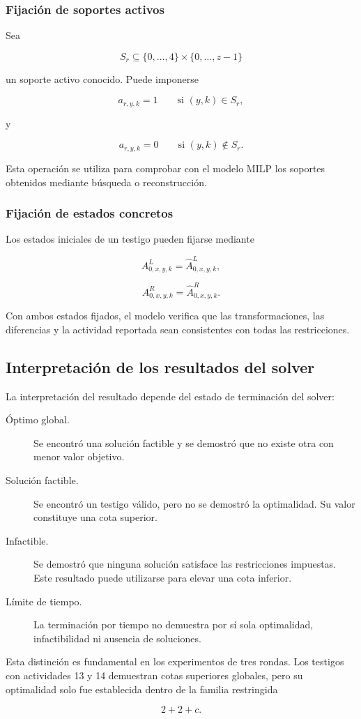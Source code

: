\subsubsection{Fijación de soportes activos}

Sea

\[
S_r
\subseteq
\{0,\ldots,4\}
\times
\{0,\ldots,z-1\}
\]

un soporte activo conocido. Puede imponerse

\[
a_{r,y,k}=1
\qquad
\text{si }(y,k)\in S_r,
\]

y

\[
a_{r,y,k}=0
\qquad
\text{si }(y,k)\notin S_r.
\]

Esta operación se utiliza para comprobar con el modelo MILP los soportes
obtenidos mediante búsqueda o reconstrucción.


\subsubsection{Fijación de estados concretos}

Los estados iniciales de un testigo pueden fijarse mediante

\[
A_{0,x,y,k}^{L}
=
\widehat{A}_{0,x,y,k}^{L},
\]

\[
A_{0,x,y,k}^{R}
=
\widehat{A}_{0,x,y,k}^{R}.
\]

Con ambos estados fijados, el modelo verifica que las transformaciones, las
diferencias y la actividad reportada sean consistentes con todas las
restricciones.


\subsection{Interpretación de los resultados del solver}
\label{subsec:interpretacion_solver}

La interpretación del resultado depende del estado de terminación del
solver:

\begin{description}
    \item[Óptimo global.] Se encontró una solución factible y se demostró
    que no existe otra con menor valor objetivo.

    \item[Solución factible.] Se encontró un testigo válido, pero no se
    demostró la optimalidad. Su valor constituye una cota superior.

    \item[Infactible.] Se demostró que ninguna solución satisface las
    restricciones impuestas. Este resultado puede utilizarse para elevar
    una cota inferior.

    \item[Límite de tiempo.] La terminación por tiempo no demuestra por sí
    sola optimalidad, infactibilidad ni ausencia de soluciones.
\end{description}

Esta distinción es fundamental en los experimentos de tres rondas. Los
testigos con actividades 13 y 14 demuestran cotas superiores globales,
pero su optimalidad solo fue establecida dentro de la familia restringida

\[
2+2+c.
\]
